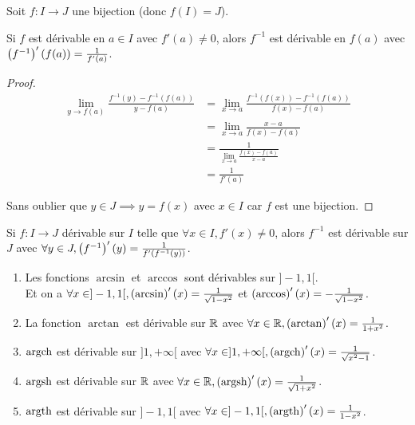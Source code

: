 \documentclass[12pt, a4paper]{report}
\begin{document}
\begin{property}
    Soit $f:I\to J$ une bijection (donc $f(I)=J$).

    Si $f$ est dérivable en $a \in I$ avec $f'(a) \neq 0$, alors $f^{-1}$ est dérivable en $f(a)$ avec $\left(f^{-1}\right)'(f(a)) = \frac{1}{f'(a)}$.
\end{property}

\begin{proof}
    \begin{align*}
        \lim_{y\to f(a)} \frac{f^{-1}(y) - f^{-1}(f(a))}{y - f(a)} &= \lim_{x\to a} \frac{f^{-1}(f(x)) - f^{-1}(f(a))}{f(x) - f(a)} \\
            &= \lim_{x\to a} \frac{x - a}{f(x) - f(a)} \\
            &= \frac{1}{\lim_{x\to a} \frac{f(x) - f(a)}{x - a}} \\
            &= \frac{1}{f'(a)}
    \end{align*}

    Sans oublier que $y \in J \implies y = f(x)$ avec $x \in I$ car $f$ est une bijection.
\end{proof}

\begin{remark}
    Si $f:I\to J$ dérivable sur $I$ telle que $\forall x \in I, f'(x) \neq 0$, alors $f^{-1}$ est dérivable sur $J$ avec $\forall y \in J, \left(f^{-1}\right)'(y) = \frac{1}{f'(f^{-1}(y))}$.
\end{remark}

\begin{property}
    \begin{enumerate}
        \item Les fonctions $\arcsin$ et $\arccos$ sont dérivables sur $]-1,1[$.\\Et on a $\forall x \in ]-1,1[, \left(\arcsin\right)'(x) = \frac{1}{\sqrt{1-x^2}}$ et $\left(\arccos\right)'(x) = -\frac{1}{\sqrt{1-x^2}}$.
        \item La fonction $\arctan$ est dérivable sur $\mathbb{R}$ avec $\forall x \in \mathbb{R}, \left(\arctan\right)'(x) = \frac{1}{1+x^2}$.
        \item $\mathrm{argch}$ est dérivable sur $]1,+\infty[$ avec $\forall x \in ]1,+\infty[, \left(\mathrm{argch}\right)'(x) = \frac{1}{\sqrt{x^2-1}}$.
        \item $\mathrm{argsh}$ est dérivable sur $\mathbb{R}$ avec $\forall x \in \mathbb{R}, \left(\mathrm{argsh}\right)'(x) = \frac{1}{\sqrt{1+x^2}}$.
        \item $\mathrm{argth}$ est dérivable sur $]-1,1[$ avec $\forall x \in ]-1,1[, \left(\mathrm{argth}\right)'(x) = \frac{1}{1-x^2}$.
    \end{enumerate}
\end{property}
\end{document}
